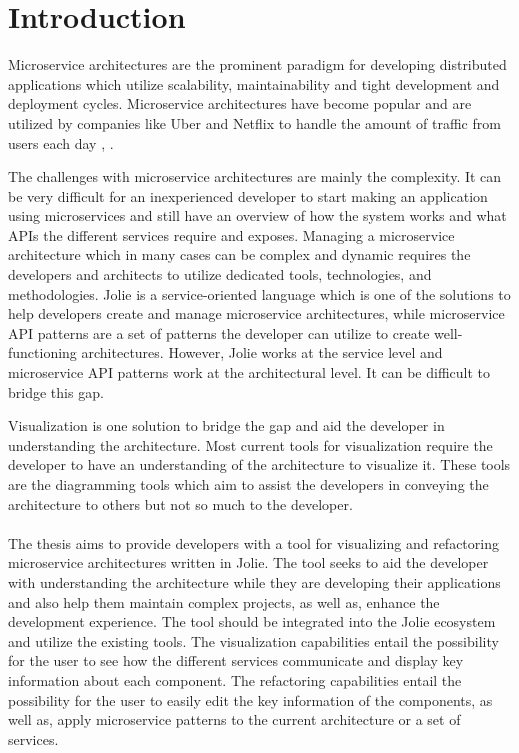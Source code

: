 \chapter{Introduction}
Microservice architectures are the prominent paradigm for developing distributed applications which utilize scalability, maintainability and tight development and deployment cycles.
Microservice architectures have become popular and are utilized by companies like Uber and Netflix
to handle the amount of traffic from users each day \cite{netflix}, \cite{uber}.

The challenges with microservice architectures are mainly the complexity. It can be very difficult for an inexperienced developer to start making an application using microservices and still have an overview of how the system works and what APIs the different services require and exposes.
Managing a microservice architecture which in many cases can be complex and dynamic requires the developers and architects to utilize dedicated tools, technologies, and methodologies.
Jolie \cite{jolie} is a service-oriented language which is one of the solutions to help developers create and manage microservice architectures, while microservice API patterns \cite{PatternsForAPIDesign:2022} are a set of patterns the developer can utilize to create well-functioning architectures.
However, Jolie works at the service level and microservice API patterns work at the architectural level. It can be difficult to bridge this gap.

Visualization is one solution to bridge the gap and aid the developer in understanding the architecture.
Most current tools for visualization require the developer to have an understanding of the architecture to visualize it.
These tools are the diagramming tools which aim to assist the developers in conveying the architecture to others but not so much to the developer.
\\
\\
The thesis aims to provide developers with a tool for visualizing and refactoring microservice architectures written in Jolie. The tool seeks to aid the developer with understanding the architecture while they are developing their applications and also 
help them maintain complex projects, as well as, enhance the development experience.
The tool should be integrated into the Jolie ecosystem and utilize the existing tools.
The visualization capabilities entail the possibility for the user to see how the different services communicate and display key information about each component.
The refactoring capabilities entail the possibility for the user to easily edit the key information of the components, as well as, apply microservice patterns to the current architecture or a set of services.

